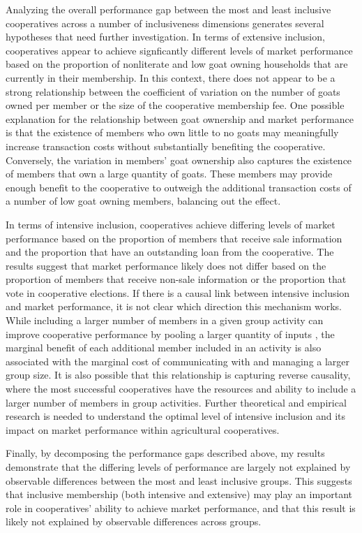 \documentclass[11pt]{article}
\begin{document}
Analyzing the overall performance gap between the most and least inclusive cooperatives across a number of inclusiveness dimensions generates several hypotheses that need further investigation. In terms of extensive inclusion, cooperatives appear to achieve signficantly different levels of market performance based on the proportion of nonliterate and low goat owning households that are currently in their membership. In this context, there does not appear to be a strong relationship between the coefficient of variation on the number of goats owned per member or the size of the cooperative membership fee. One possible explanation for the relationship between goat ownership and market performance is that the existence of members who own little to no goats may meaningfully increase transaction costs without substantially benefiting the cooperative. Conversely, the variation in members' goat ownership also captures the existence of members that own a large quantity of goats. These members may provide enough benefit to the cooperative to outweigh the additional transaction costs of a number of low goat owning members, balancing out the effect. 

In terms of intensive inclusion, cooperatives achieve differing levels of market performance based on the proportion of members that receive sale information and the proportion that have an outstanding loan from the cooperative. The results suggest that market performance likely does not differ based on the proportion of members that receive non-sale information or the proportion that vote in cooperative elections. If there is a causal link between intensive inclusion and market performance, it is not clear which direction this mechanism works. While including a larger number of members in a given group activity can improve cooperative performance by pooling a larger quantity of inputs \citep{aflagah_cheap_2019}, the marginal benefit of each additional member included in an activity is also associated with the marginal cost of communicating with and managing a larger group size. It is also possible that this relationship is capturing reverse causality, where the most successful cooperatives have the resources and ability to include a larger number of members in group activities. Further theoretical and empirical research is needed to understand the optimal level of intensive inclusion and its impact on market performance within agricultural cooperatives.

Finally, by decomposing the performance gaps described above, my results demonstrate that the differing levels of performance are largely not explained by observable differences between the most and least inclusive groups. This suggests that inclusive membership (both intensive and extensive) may play an important role in cooperatives' ability to achieve market performance, and that this result is likely not explained by observable differences across groups.
\end{document}
